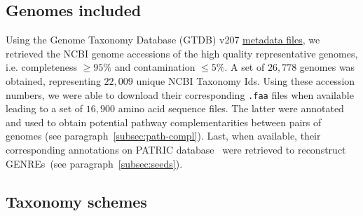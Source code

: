 \documentclass[sn-mathphys,Numbered]{sn-jnl}  %
\theoremstyle{thmstyleone}%
\theoremstyle{thmstyletwo}%
\theoremstyle{thmstylethree}%
\begin{document}
    \subsection*{Genomes included}
    \label{subsec:genomes}

        Using the Genome Taxonomy Database (GTDB) v207 \href{https://data.gtdb.ecogenomic.org/releases/release207/207.0/}{metadata files}, we retrieved the NCBI genome accessions of the high quality representative genomes, i.e. completeness $\geq 95\%$  and contamination $\leq 5\%$.
        A set of $26,778$ genomes was obtained, representing $22,009$ unique NCBI Taxonomy Ids.
        Using these accession numbers, we were able to download their corresponding \texttt{.faa} files when available 
        leading to a set of $16,900$ amino acid sequence files.
        The latter were annotated and used to obtain potential pathway complementarities between pairs of genomes (see paragraph~\ref{subsec:path-compl}).
        Last, when available, their corresponding annotations on PATRIC database~\cite{wattam2017improvements} were retrieved to reconstruct GENREs~(see paragraph~\ref{subsec:seeds}).


    \subsection*{Taxonomy schemes}
    \label{subsec:taxonomies}
\end{document}
